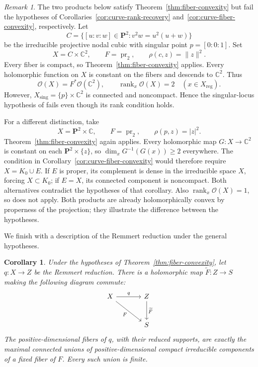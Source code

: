 \documentclass[11pt]{amsart}
\newtheorem{corollary}[theorem]{Corollary}
\theoremstyle{definition}
\theoremstyle{remark}
\newtheorem{remark}{Remark}[section]
\numberwithin{equation}{section}
\newcommand{\C}{\mathbb C}
\newcommand{\PP}{\mathbf P}
\newcommand{\OO}{\mathcal O}
\begin{document}
\begin{remark}\label{rem:curve-singular-example}
The two products below satisfy Theorem~\ref{thm:fiber-convexity}
but fail the hypotheses of
Corollaries~\ref{cor:curve-rank-recovery}
and~\ref{cor:curve-fiber-convexity}, respectively.
Let
\[
 C=\bigl\{[u:v:w]\in\PP^2:v^2w=u^2(u+w)\bigr\}
\]
be the irreducible projective nodal cubic with singular point
$p=[0:0:1]$. Set
\[
 X=C\times\C^2,\qquad F=\operatorname{pr}_2,
 \qquad\rho(c,z)=\|z\|^2.
\]
Every fiber is compact, so Theorem~\ref{thm:fiber-convexity} applies.
Every holomorphic function on $X$ is constant on the fibers and
descends to $\C^2$. Thus
\[
 \OO(X)=F^*\OO(\C^2),\qquad
 \operatorname{rank}_x\OO(X)=2\quad(x\in X_{\mathrm{reg}}).
\]
However, $X_{\mathrm{sing}}=\{p\}\times\C^2$ is connected and
noncompact. Hence the singular-locus hypothesis of
\cite[Theorem~1.1]{VijituForum2022} fails even though its rank
condition holds.

For a different distinction, take
\[
 X=\PP^2\times\C,\qquad F=\operatorname{pr}_2,
 \qquad\rho(p,z)=|z|^2.
\]
Theorem~\ref{thm:fiber-convexity} again applies. Every holomorphic
map $G:X\to\C^2$ is constant on each $\PP^2\times\{z\}$, so
$\dim_xG^{-1}(G(x))\ge2$ everywhere. The condition in
Corollary~\ref{cor:curve-fiber-convexity} would therefore require
$X=K_0\cup E$. If $E$ is proper, its complement is dense in the
irreducible space $X$, forcing $X\subset K_0$; if $E=X$, its
connected component is noncompact. Both alternatives contradict
the hypotheses of that corollary. Also
$\operatorname{rank}_x\OO(X)=1$, so
\cite[Theorem~1.1]{VijituForum2022} does not apply.
Both products are already holomorphically convex by properness of
the projection; they illustrate the difference between the hypotheses.
\end{remark}

We finish with a description of the Remmert reduction under the
general hypotheses.

\begin{corollary}\label{cor:curve-contraction}
Under the hypotheses of Theorem~\ref{thm:fiber-convexity}, let
$q:X\to Z$ be the Remmert reduction. There is a
holomorphic map $\widetilde F:Z\to S$ making the following
diagram commute:
\[
\begin{tikzcd}[column sep=large,row sep=large]
 X \arrow[r,"q"] \arrow[dr,"F"'] & Z \arrow[d,"\widetilde F"] \\
 & S
\end{tikzcd}
\]
The positive-dimensional fibers of $q$, with their reduced supports,
are exactly the maximal connected unions of positive-dimensional
compact irreducible components of a fixed fiber of $F$.
Every such union is finite.
\end{corollary}
\end{document}
